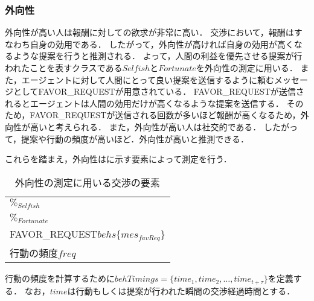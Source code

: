\subsubsection{外向性}
外向性が高い人は報酬に対しての欲求が非常に高い．
交渉において，報酬はすなわち自身の効用である．
したがって，外向性が高ければ自身の効用が高くなるような提案を行うと推測される．
よって，人間の利益を優先させる提案が行われたことを表すクラスである$\mathit{Selfish}$と$Fortunate$を外向性の測定に用いる．
また，エージェントに対して人間にとって良い提案を送信するように頼むメッセージとしてFAVOR\_REQUESTが用意されている．
FAVOR\_REQUESTが送信されるとエージェントは人間の効用だけが高くなるような提案を送信する．
そのため，FAVOR\_REQUESTが送信される回数が多いほど報酬が高くなるため，外向性が高いと考えられる．
また，外向性が高い人は社交的である．
したがって，提案や行動の頻度が高いほど．外向性が高いと推測できる．

これらを踏まえ，外向性はに示す要素によって測定を行う．

\begin{table}[tb]
    \centering
    \caption{外向性の測定に用いる交渉の要素}
    \begin{tabular}{l} \toprule
        $\%_{\mathit{Selfish}}$ \\
        $\%_{Fortunate}$ \\
        FAVOR\_REQUEST$behs\{mes_{\mathit{favReq}}\}$ \\
        行動の頻度$\mathit{freq}$ \\ \bottomrule
    \end{tabular}
    \label{tab:extraversion}
\end{table}

行動の頻度を計算するために$behTimings = \{time_1, time_2 , \ldots , time_{t+\tau}\}$を定義する．
なお，$time$は行動もしくは提案が行われた瞬間の交渉経過時間とする．

